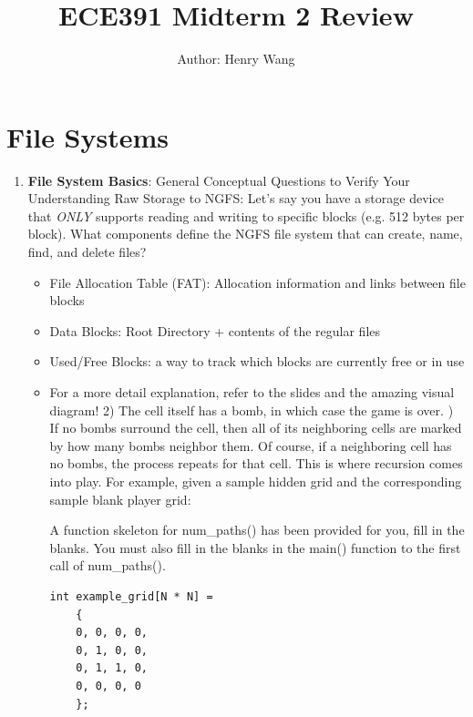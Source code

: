 \documentclass{article}
\title{ECE391 Midterm 2 Review}
\author{Author: Henry Wang}
\begin{document}
\maketitle

\section{
    File Systems
}

\begin{enumerate}[label=(\alph*)]
    \item \textbf{File System Basics}: General Conceptual Questions to Verify Your Understanding \newline \newline
    Raw Storage to NGFS: Let's say you have a storage device that \emph{ONLY} supports reading and writing to specific blocks (e.g. 512 bytes per block). What components define the NGFS file system that can create, name, find, and delete files? \newline
    \begin{itemize}
            \item File Allocation Table (FAT): Allocation information and links between file blocks
            \item Data Blocks: Root Directory + contents of the regular files
            \item Used/Free Blocks: a way to track which blocks are currently free or in use
            \item For a more detail explanation, refer to the slides and the amazing visual diagram! %
    2) The cell itself has a bomb, in which case the game is over. ) If no bombs surround the cell, then all of its neighboring cells are marked by how many bombs neighbor them. Of course, if a neighboring cell has no bombs, the process repeats for that cell. This is where recursion comes into play. For example, given a sample hidden grid and the corresponding sample blank player grid: 
    \newline


    A function skeleton for num\_paths() has been provided for you, fill in the blanks. You must also fill in the blanks in the main() function to the first call of num\_paths().

    \begin{lstlisting}[style=CStyle]
    int example_grid[N * N] = 
    {
    0, 0, 0, 0,
    0, 1, 0, 0,
    0, 1, 1, 0,
    0, 0, 0, 0 
    };
    

\end{lstlisting}
\end{itemize}
\end{enumerate}
\end{document}
